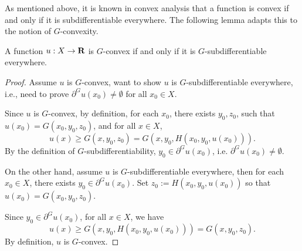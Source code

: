 			
As mentioned above, it is known in convex analysis that a function is convex if and only if it is subdifferentiable everywhere. The following lemma adapts this to the notion of $G$-convexity. \medskip
			
\begin{lemma}\label{convex-subdiff0}
A function $u: X \rightarrow {\mathbf R}$ is $G$-convex if and only if it is $G$-subdifferentiable everywhere.
\end{lemma}
\begin{proof}[Proof]
		Assume $u$ is $G$-convex, want to show $u$ is $G$-subdifferentiable everywhere, i.e., need to prove  $\partial^G u(x_0)\neq \emptyset$ for all $x_0\in X$.
		
		Since $u$ is $G$-convex, by definition, for each $x_0$, there exists $ y_0, z_0$, such that $u(x_0) = G(x_0,y_0,z_0)$, and for all  $ x \in X$, 
		\begin{equation*}
		u(x)\ge G(x, y_0, z_0) = G(x, y_0, H(x_0,y_0,u(x_0))).
		\end{equation*}
		By the definition of $G$-subdifferentiability, $y_0 \in \partial^G u(x_0)$, i.e. $\partial^G u(x_0) \neq \emptyset$.
		
		On the other hand, assume $u$ is $G$-subdifferentiable everywhere, then for each $ x_0 \in X$,  there exists $ y_0 \in \partial^G u(x_0)$. Set $z_0:=H(x_0,y_0,u(x_0))$ so that $u(x_0) = G(x_0, y_0, z_0)$.
		
		Since $y_0\in \partial^G u(x_0)$, for all $x\in X$, we have 
		\begin{equation*}
		u(x)\ge G(x,y_0,H(x_0,y_0,u(x_0))) = G(x,y_0,z_0).
		\end{equation*}
		By definition, $u$ is $G$-convex.
\end{proof}
%	
%	
%	
%	
%	
				
